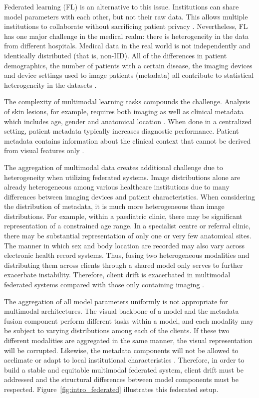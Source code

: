 \documentclass{ieeeaccess}
\begin{document}
Federated learning (FL) is an alternative to this issue. Institutions can share model parameters with each other, but not their raw data. This allows multiple institutions to collaborate without sacrificing patient privacy \cite{McMahan2017,Rieke2020}. Nevertheless, FL has one major challenge in the medical realm: there is heterogeneity in the data from different hospitals. Medical data in the real world is not independently and identically distributed (that is, non-IID). All of the differences in patient demographics, the number of patients with a certain disease, the imaging devices and device settings used to image patients (metadata) all contribute to statistical heterogeneity in the datasets \cite{Zhao2018,Li2020}.

The complexity of multimodal learning tasks compounds the challenge. Analysis of skin lesions, for example, requires both imaging as well as clinical metadata which includes age, gender and anatomical location \cite{Nunnari2020,Gessert2020}. When done in a centralized setting, patient metadata typically increases diagnostic performance. Patient metadata contains information about the clinical context that cannot be derived from visual features only \cite{Gessert2020,Nunnari2020}.

The aggregation of multimodal data creates additional challenge due to heterogeneity when utilizing federated systems. Image distributions alone are already heterogeneous among various healthcare institutions due to many differences between imaging devices and patient characteristics. When considering the distribution of metadata, it is much more heterogeneous than image distributions. For example, within a paediatric clinic, there may be significant representation of a constrained age range. In a specialist centre or referral clinic, there may be substantial representation of only one or very few anatomical sites. The manner in which sex and body location are recorded may also vary across electronic health record systems. Thus, fusing two heterogeneous modalities and distributing them across clients through a shared model only serves to further exacerbate instability. Therefore, client drift is exacerbated in multimodal federated systems compared with those only containing imaging \cite{Zhu2025}.

The aggregation of all model parameters uniformly is not appropriate for multimodal architectures. The visual backbone of a model and the metadata fusion component perform different tasks within a model, and each modality may be subject to varying distributions among each of the clients. If these two different modalities are aggregated in the same manner, the visual representation will be corrupted. Likewise, the metadata components will not be allowed to acclimate or adapt to local institutional characteristics \cite{Zhu2025}. Therefore, in order to build a stable and equitable multimodal federated system, client drift must be addressed and the structural differences between model components must be respected. Figure~\ref{fig:intro_federated} illustrates this federated setup.
\end{document}
